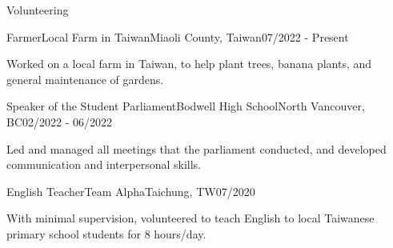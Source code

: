 \documentclass{article}
\newlength{\tabin}
\newlength{\secsep}
\newcommand{\lineunder}{\vspace*{-8pt} \\ \hspace*{-6pt} \hrulefill \\ \vspace*{-15pt}}
\newenvironment{tabbedsection}[1]{
  \begin{list}{}{
      \setlength{\itemsep}{0pt}
      \setlength{\labelsep}{0pt}
      \setlength{\labelwidth}{0pt}
      \setlength{\leftmargin}{\tabin}
      \setlength{\rightmargin}{\tabin}
      \setlength{\listparindent}{0pt}
      \setlength{\parsep}{0pt}
      \setlength{\parskip}{0pt}
      \setlength{\partopsep}{0pt}
      \setlength{\topsep}{#1}
    }
  \item[]
}{\end{list}}
\newenvironment{resume_section}[1]{
  \filbreak
  \vspace{2\secsep}
  \textsc{\large#1}
  \lineunder
  \begin{tabbedsection}{\secsep}
}{\end{tabbedsection}}
\newenvironment{subitems}{
  \renewcommand{\labelitemi}{-}
  \begin{itemize}
      \setlength{\labelsep}{1em}
}{\end{itemize}}
\newenvironment{resume_employer}[4]{
  \vspace{\secsep}
  \textbf{#1} {\footnotesize #3} \hfill {\footnotesize#4} \hspace{-1em} \\
  \small{#2}  
  \vspace{\secsep}
  \begin{tabbedsection}{0pt}
  \begin{subitems}
}{\end{subitems}\end{tabbedsection}}
\begin{document}
\begin{resume_section}{Volunteering}
  \begin{resume_employer}{Farmer}{Local Farm in Taiwan}{Miaoli County, Taiwan}{07/2022 - Present}
    \item Worked on a local farm in Taiwan, to help plant trees, banana plants, and general maintenance of gardens.
  \end{resume_employer}
  \begin{resume_employer}{Speaker of the Student Parliament}{Bodwell High School}{North Vancouver, BC}{02/2022 - 06/2022}
    \item Led and managed all meetings that the parliament conducted, and developed communication and interpersonal skills. 
  \end{resume_employer}


  \begin{resume_employer}{English Teacher}{Team Alpha}{Taichung, TW}{07/2020}
    \item  With minimal supervision, volunteered to teach English to local Taiwanese primary school students for 8 hours/day.
  \end{resume_employer}

\end{resume_section}
  
\end{document}
